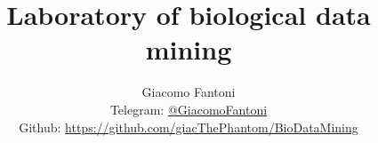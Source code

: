 

\title{\Huge \textbf{Laboratory of biological data mining}}

\author{
  Giacomo Fantoni \\
  \small Telegram: \href{https://t.me/GiacomoFantoni}{@GiacomoFantoni} \\[3pt]
  \small Github: \href{https://github.com/giacThePhantom/DataMining}{https://github.com/giacThePhantom/BioDataMining}}

\maketitle
\tableofcontents


